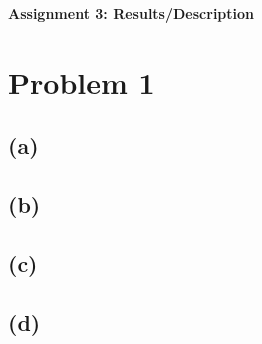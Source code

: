 \documentclass[12pt]{article}
\begin{document}
\begin{center}\begin{LARGE}
\textbf{Assignment 3: Results/Description}
\end{LARGE}\end{center}

\section*{Problem 1}

\subsection*{(a)}



\subsection*{(b)}



\subsection*{(c)}



\subsection*{(d)}
\end{document}
